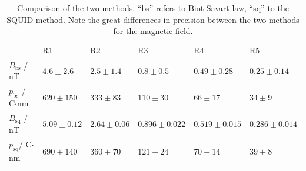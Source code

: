 \begin{table}[htb]
\caption{Comparison of the two methods. ``bs'' refers to Biot-Savart law, 
    ``sq'' to the SQUID method. Note the great differences in precision between 
    the two methods for the magnetic field.}
\begin{tabular}{ l| p{2.3cm}|p{2.3cm}|p{2.3cm}|p{2.3cm}|p{2.3cm}}
 \rowcolor{tabcolor}& R1 & R2 & R3 & R4 & R5 \\ 
$B_{\mathrm{bs}}$ / nT &$4.6 \pm 2.6$&$2.5 \pm 1.4$ &$0.8 \pm 0.5$ &$0.49 \pm 0.28$ &$0.25 \pm 0.14$ \\ 
$p_{\mathrm{bs}}$ / C$\cdot$nm &$620 \pm 150$ &$333 \pm 83$ &$110 \pm 30$ &$66 \pm 17$ &$34 \pm 9$\\
$B_{\mathrm{sq}}$ / nT &$5.09 \pm 0.12$&$2.64 \pm 0.06$&$0.896 \pm 0.022$&$0.519 \pm 0.015$&$0.286 \pm 0.014$\\  
$p_{\mathrm{sq}}$/ C$\cdot$nm &$690 \pm 140$ & $360 \pm 70$ &$121 \pm 24$ & $70 \pm 14$ & $39 \pm 8$ \\
\end{tabular}
\label{tab:comparison}
\end{table}
\FloatBarrier
